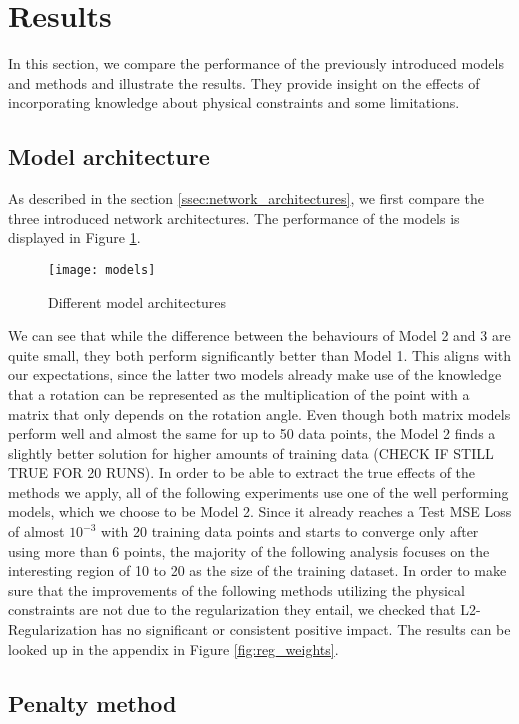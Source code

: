 \label{section:results}
\section{Results}

In this section, we compare the performance of the previously introduced models and methods and illustrate the results. They provide insight on the effects of incorporating knowledge about physical constraints and some limitations.

\subsection{Model architecture}
As described in the section \ref{ssec:network_architectures}, we first compare the three introduced network architectures. The performance of the models is displayed in Figure \ref{fig:models}.
\begin{figure}[ht]
	\texttt{[image: models]}
	\caption{Different model architectures}
	\label{fig:models}
\end{figure}
We can see that while the difference between the behaviours of Model 2 and 3 are quite small, they both perform significantly better than Model 1. This aligns with our expectations, since the latter two models already make use of the knowledge that a rotation can be represented as the multiplication of the point with a matrix that only depends on the rotation angle. Even though both matrix models perform well and almost the same for up to 50 data points, the Model 2 finds a slightly better solution for higher amounts of training data (CHECK IF STILL TRUE FOR 20 RUNS). In order to be able to extract the true effects of the methods we apply, all of the following experiments use one of the well performing models, which we choose to be Model 2. Since it already reaches a Test MSE Loss of almost $10^{-3}$ with 20 training data points and starts to converge only after using more than 6 points, the majority of the following analysis focuses on the interesting region of 10 to 20 as the size of the training dataset. In order to make sure that the improvements of the following methods utilizing the physical constraints are not due to the regularization they entail, we checked that L2-Regularization has no significant or consistent positive impact. The results can be looked up in the appendix in Figure \ref{fig:reg_weights}.

\subsection{Penalty method}
